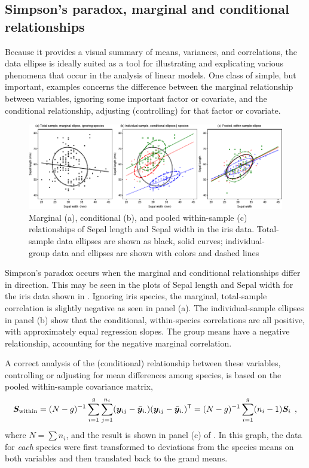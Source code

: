 \subsection{Simpson's paradox, marginal and conditional relationships}\label{sec:simpson-iris}

Because it provides a visual summary of means, variances, and correlations,
the data ellipse is ideally suited as a tool for illustrating and
explicating various
phenomena that occur in the analysis of linear models.
One class of simple, but important, examples concerns the difference between the marginal
relationship between variables, ignoring some important factor or covariate,
and the conditional relationship, adjusting (controlling) for that
factor or covariate.

\begin{figure}[htb]
  \centering
  \includegraphics[width=\textwidth,clip]{fig/contiris3}
  \caption{Marginal (a), conditional (b), and pooled within-sample (c) relationships
  of Sepal length and Sepal width in the iris data. Total-sample data ellipses are
  shown as black, solid curves; individual-group data and ellipses are shown with
  colors and dashed lines}%
  \label{fig:contiris3}
\end{figure}

Simpson's paradox \citep{Simpson:51} occurs when the marginal and
conditional relationships differ in direction. This may be seen in the plots
of Sepal length and Sepal width for the iris data shown in . Ignoring
iris species, the marginal, total-sample correlation is slightly negative
as seen in panel (a). The individual-sample ellipses in panel (b) show
that the conditional, within-species correlations are all positive, with
approximately equal regression slopes.  The group means have a negative
relationship, accounting for the negative marginal correlation.

A correct analysis of the (conditional) relationship between these variables, controlling or adjusting for mean
differences among species, is based on the pooled within-sample covariance matrix,
  \begin{equation} \label{eq:Sp}
  \bm{S}_{\textrm{within}}  = (N - g)^{-1}
  \sum_{i=1}^g
  \sum_{j=1}^{n_i}
  ( \bm{y}_{ij}  -  \bar{\bm{y}}_{i.} )
  ( \bm{y}_{ij}  -  \bar{\bm{y}}_{i.} ) ^\mathsf{T}
  =(N - g)^{-1}
  \sum_{i=1}^g
  (n_i - 1) \bm{S}_i
  \:\: ,
  \end{equation}
where $N = \sum n_i$, and the result
is shown in
panel (c) of .
In this graph, the data for \emph{each} species were first
transformed to deviations from the species means on both variables
and then translated back to the grand means.


